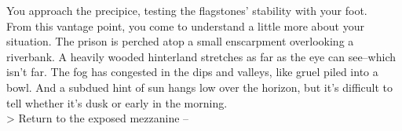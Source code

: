 You approach the precipice, testing the flagstones' stability with your foot.\\

From this vantage point, you come to understand a little more about your situation. The prison is perched atop a small enscarpment overlooking a riverbank. A heavily wooded hinterland stretches as far as the eye can see--which isn’t far. The fog has congested in the dips and valleys, like gruel piled into a bowl. And a subdued hint of sun hangs low over the horizon, but it's difficult to tell whether it's dusk or early in the morning.\\

> Return to the exposed mezzanine -- 